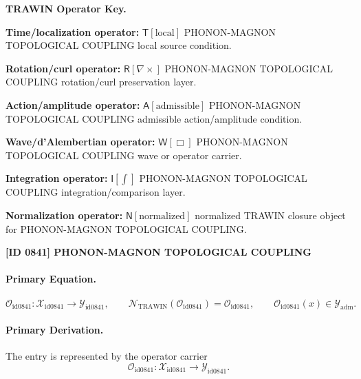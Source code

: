 \par\vspace{0.45\baselineskip}
\noindent\begin{minipage}[t]{\linewidth}
\begingroup
\small
\raggedright
\textbf{TRAWIN Operator Key.}\par
\noindent\textbf{Time/localization operator:} $\mathsf{T}\!\left[\mathrm{local}\right]$ PHONON-MAGNON TOPOLOGICAL COUPLING local source condition.\par
\noindent\textbf{Rotation/curl operator:} $\mathsf{R}\!\left[\nabla\times\right]$ PHONON-MAGNON TOPOLOGICAL COUPLING rotation/curl preservation layer.\par
\noindent\textbf{Action/amplitude operator:} $\mathsf{A}\!\left[\mathrm{admissible}\right]$ PHONON-MAGNON TOPOLOGICAL COUPLING admissible action/amplitude condition.\par
\noindent\textbf{Wave/d'Alembertian operator:} $\mathsf{W}\!\left[\Box\right]$ PHONON-MAGNON TOPOLOGICAL COUPLING wave or operator carrier.\par
\noindent\textbf{Integration operator:} $\mathsf{I}\!\left[\int\right]$ PHONON-MAGNON TOPOLOGICAL COUPLING integration/comparison layer.\par
\noindent\textbf{Normalization operator:} $\mathsf{N}\!\left[\mathrm{normalized}\right]$ normalized TRAWIN closure object for PHONON-MAGNON TOPOLOGICAL COUPLING.\par
\endgroup
\end{minipage}

\clearpage
\noindent\textbf{[ID 0841] PHONON-MAGNON TOPOLOGICAL COUPLING}\par
\vspace{0.35em}
\paragraph{Primary Equation.}
\[
\mathcal{O}_{\mathrm{id0841}}:\mathcal{X}_{\mathrm{id0841}}\longrightarrow \mathcal{Y}_{\mathrm{id0841}},\qquad
\mathcal{N}_{\mathrm{TRAWIN}}(\mathcal{O}_{\mathrm{id0841}})=\mathcal{O}_{\mathrm{id0841}},\qquad
\mathcal{O}_{\mathrm{id0841}}(x)\in\mathcal{Y}_{\mathrm{adm}}.
\]

\paragraph{Primary Derivation.} The entry is represented by the operator carrier\[
\mathcal{O}_{\mathrm{id0841}}:\mathcal{X}_{\mathrm{id0841}}\longrightarrow \mathcal{Y}_{\mathrm{id0841}}.
\]

